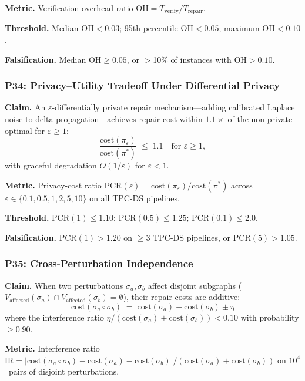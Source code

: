 \documentclass[11pt,a4paper]{article}
\theoremstyle{definition}
\newcommand{\cost}{\mathrm{cost}}
\begin{document}
\textbf{Metric.}  Verification overhead ratio
$\mathrm{OH} = T_{\mathrm{verify}} / T_{\mathrm{repair}}$.

\textbf{Threshold.}  Median $\mathrm{OH} < 0.03$; 95th percentile
$\mathrm{OH} < 0.05$; maximum $\mathrm{OH} < 0.10$.

\textbf{Falsification.}  Median $\mathrm{OH} \geq 0.05$, or $>$10\% of
instances with $\mathrm{OH} > 0.10$.

\subsubsection{P34: Privacy--Utility Tradeoff Under Differential Privacy}
\label{sec:p34}

\textbf{Claim.}
An $\varepsilon$-differentially private repair mechanism---adding calibrated
Laplace noise to delta propagation---achieves repair cost within $1.1\times$
of the non-private optimal for $\varepsilon \geq 1$:
\[
  \frac{\cost(\pi_\varepsilon)}{\cost(\pi^*)} \;\leq\; 1.1
  \quad\text{for } \varepsilon \geq 1,
\]
with graceful degradation $O(1/\varepsilon)$ for $\varepsilon < 1$.

\textbf{Metric.}  Privacy-cost ratio
$\mathrm{PCR}(\varepsilon) = \cost(\pi_\varepsilon) / \cost(\pi^*)$
across $\varepsilon \in \{0.1, 0.5, 1, 2, 5, 10\}$ on all TPC-DS pipelines.

\textbf{Threshold.}  $\mathrm{PCR}(1) \leq 1.10$;
$\mathrm{PCR}(0.5) \leq 1.25$; $\mathrm{PCR}(0.1) \leq 2.0$.

\textbf{Falsification.}  $\mathrm{PCR}(1) > 1.20$ on $\geq$3 TPC-DS
pipelines, or $\mathrm{PCR}(5) > 1.05$.

\subsubsection{P35: Cross-Perturbation Independence}
\label{sec:p35}

\textbf{Claim.}
When two perturbations $\sigma_a, \sigma_b$ affect disjoint subgraphs
($V_{\mathrm{affected}}(\sigma_a) \cap V_{\mathrm{affected}}(\sigma_b)
= \emptyset$), their repair costs are additive:
\[
  \cost(\sigma_a \circ \sigma_b) \;=\;
  \cost(\sigma_a) + \cost(\sigma_b) \pm \eta
\]
where the interference ratio $\eta / (\cost(\sigma_a) + \cost(\sigma_b))
< 0.10$ with probability $\geq 0.90$.

\textbf{Metric.}  Interference ratio
$\mathrm{IR} = |\cost(\sigma_a \circ \sigma_b) - \cost(\sigma_a) -
\cost(\sigma_b)| / (\cost(\sigma_a) + \cost(\sigma_b))$ on $10^4$~pairs
of disjoint perturbations.
\end{document}
